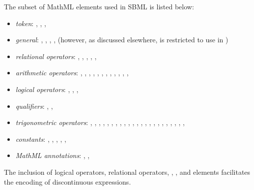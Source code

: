 The subset of MathML elements used in SBML is listed below:
\begin{itemize}\setlength{\parskip}{-0.1ex}

\item \emph{token}: , , ,
  
\item \emph{general}: , ,
  , ,  (however, as
  discussed elsewhere,  is restricted to use in
  \FunctionDefinition)

\item \emph{relational operators}: , ,
  , , , 

\item \emph{arithmetic operators}: , ,
  , , , ,
  , , , ,
  , , 

\item \emph{logical operators}: , ,
  , 

\item \emph{qualifiers}: , ,

\item \emph{trigonometric operators}: , ,
  , , , ,
  , , , ,
  , , , ,
  , , , ,
  , , ,
  , , 

\item \emph{constants}: , ,
  , , ,

\item \emph{MathML annotations}: ,
  , 

\end{itemize}

The inclusion of logical operators, relational operators,
, , and  elements
facilitates the encoding of discontinuous expressions.

